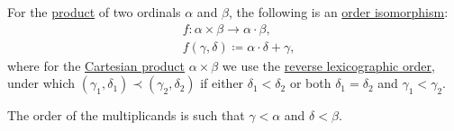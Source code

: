 \begin{proposition}\label{thm:ordinal_multiplication_cartesian_product}
  For the \hyperref[def:ordinal_arithmetic/multiplication]{product} of two ordinals \( \alpha \) and \( \beta \), the following is an \hyperref[def:preordered_set/homomorphism]{order isomorphism}:
  \begin{equation*}
    \begin{aligned}
      &f: \alpha \times \beta \to \alpha \cdot \beta, \\
      &f(\gamma, \delta) \coloneqq \alpha \cdot \delta + \gamma,
    \end{aligned}
  \end{equation*}
  where for the \hyperref[def:cartesian_product]{Cartesian product} \( \alpha \times \beta \) we use the \hyperref[def:lexicographic_order]{reverse lexicographic order}, under which \( (\gamma_1, \delta_1) \prec (\gamma_2, \delta_2) \) if either \( \delta_1 < \delta_2 \) or both \( \delta_1 = \delta_2 \) and \( \gamma_1 < \gamma_2 \).
\end{proposition}
\begin{comments}
  \item The order of the multiplicands is such that \( \gamma < \alpha \) and \( \delta < \beta \).
\end{comments}
